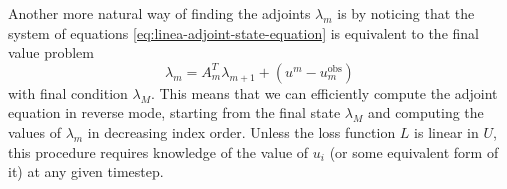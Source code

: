 Another more natural way of finding the adjoints $\lambda_m$ is by noticing that the system of equations \eqref{eq:linea-adjoint-state-equation} is equivalent to the final value problem 
\begin{equation}
    \lambda_{m} = A_{m}^T \lambda_{m+1} + (u^m - u_m^\text{obs})
    \label{eq:adjoint-discrete-linear-example}
\end{equation}
with final condition $\lambda_M$. 
This means that we can efficiently compute the adjoint equation in reverse mode, starting from the final state $\lambda_M$ and computing the values of $\lambda_m$ in decreasing index order. 
Unless the loss function $L$ is linear in $U$, this procedure requires knowledge of the value of $u_i$ (or some equivalent form of it) at any given timestep. 